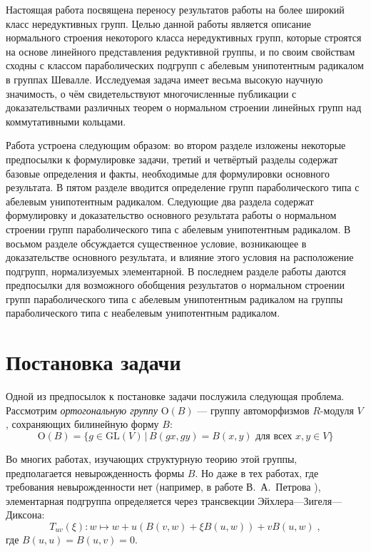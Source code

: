 \documentclass[12pt]{matmex-diploma}
\theoremstyle{mystyleni}
\theoremstyle{mystyle}
\begin{document}
Настоящая работа посвящена переносу результатов работы \citep{Stavrova2009} на более широкий класс нередуктивных групп.
Целью данной работы является описание нормального строения некоторого класса нередуктивных групп, которые строятся на основе линейного представления редуктивной группы, и по своим свойствам сходны с классом параболических подгрупп с абелевым унипотентным радикалом в группах Шевалле.
Исследуемая задача имеет весьма высокую научную значимость, о чём свидетельствуют многочисленные публикации с доказательствами различных теорем о нормальном строении линейных групп над коммутативными кольцами.

Работа устроена следующим образом: во втором разделе изложены некоторые предпосылки к формулировке задачи, третий и четвёртый разделы содержат базовые определения и факты, необходимые для формулировки основного результата. В пятом разделе вводится определение групп параболического типа с абелевым унипотентным радикалом. Следующие два раздела содержат формулировку и доказательство основного результата работы о нормальном строении групп параболического типа с абелевым унипотентным радикалом. В восьмом разделе обсуждается существенное условие, возникающее в доказательстве основного результата, и влияние этого условия на расположение подгрупп, нормализуемых элементарной.
В последнем разделе работы даются предпосылки для возможного обобщения результатов о нормальном строении групп параболического типа с абелевым унипотентным радикалом на группы параболического типа с неабелевым унипотентным радикалом.


\section{Постановка задачи}

Одной из предпосылок к постановке задачи послужила следующая проблема. 
Рассмотрим \emph{ортогональную группу} $\mathrm{O}(B)$ --- группу автоморфизмов $R$-модуля $V$, сохраняющих билинейную форму $B$:
$$ \mathrm{O}(B) = \{ g \in \mathrm{GL}(V) \,|\, B(gx,gy) = B(x,y) \text{ для всех } x,y \in V \} $$

Во многих работах, изучающих структурную теорию этой группы, предполагается невырожденность формы $B$.
Но даже в тех работах, где требования невырожденности нет (например, в работе В.~А.~Петрова \cite{Petrov2005}), элементарная подгруппа определяется через трансвекции Эйхлера---Зигеля---Диксона:
$$ T_{uv}(\xi) : w \mapsto w + u (B(v,w) + \xi B(u,w)) + v B(u,w) \;, $$
где $ B(u,u) = B(u,v) = 0$.
\end{document}
